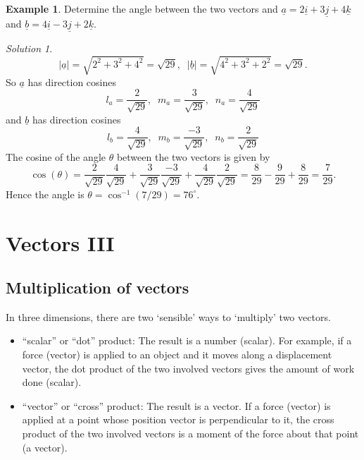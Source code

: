 \documentclass[
  english,
  11pt,
  oneside]{book}
\newcommand{\slide}{}
\theoremstyle{definition}
\theoremstyle{definition}
\newtheorem{example}{Example}[chapter]
\theoremstyle{definition}
\theoremstyle{definition}
\theoremstyle{remark}
\newtheorem*{solution}{Solution}
\begin{document}
\begin{example}
Determine the angle between the two vectors and \(\underline a = 2\underline i + 3\underline j + 4\underline k\) and \(\underline b = 4\underline i - 3\underline j + 2\underline k\).
\end{example}

\begin{solution}
\[
|\underline a| = \sqrt{2^2+3^2+4^2} = \sqrt{29},\;\;|\underline b| = \sqrt{4^2+3^2+2^2} = \sqrt{29}.
\]
So \(\underline a\) has direction cosines
\[
l_a = \frac{2}{\sqrt{29}},\;\;m_a = \frac{3}{\sqrt{29}},\;\;n_a = \frac{4}{\sqrt{29}}
\]
and \(\underline b\) has direction cosines
\[
l_b = \frac{4}{\sqrt{29}},\;\;m_b = \frac{-3}{\sqrt{29}},\;\;n_b = \frac{2}{\sqrt{29}}
\]
The cosine of the angle \(\theta\) between the two vectors is given by
\[
\cos(\theta) = \frac{2}{\sqrt{29}}\frac{4}{\sqrt{29}}+\frac{3}{\sqrt{29}}\frac{-3}{\sqrt{29}}+\frac{4}{\sqrt{29}}\frac{2}{\sqrt{29}} = \frac{8}{29}-\frac{9}{29}+\frac{8}{29} = \frac{7}{29}.
\]
Hence the angle is \(\theta = \cos^{-1}(7/29) = 76^\circ\).
\end{solution}

\slide

\section{Vectors III}\label{vectors-iii}

\subsection{Multiplication of vectors}\label{multiplication-of-vectors}

In three dimensions, there are two `sensible' ways to `multiply' two vectors.

\begin{itemize}
\item
  ``scalar'' or ``dot'' product: The result is a number (scalar). For example, if a force (vector) is applied to an object and it moves along a displacement vector, the dot product of the two involved vectors gives the amount of work done (scalar).
\item
  ``vector'' or ``cross'' product: The result is a vector. If a force (vector) is applied at a point whose position vector is perpendicular to it, the cross product of the two involved vectors is a moment of the force about that point (a vector).
\end{itemize}
\end{document}

